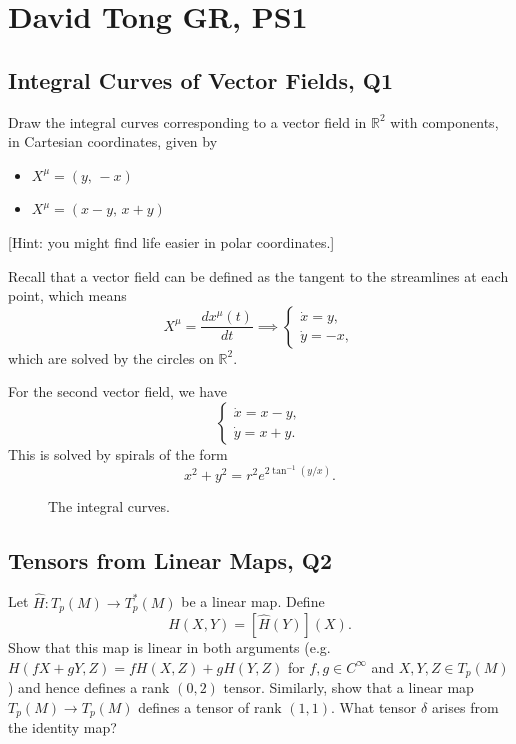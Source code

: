 \section{David Tong GR, PS1}
\subsection{Integral Curves of Vector Fields, Q1}

Draw the integral curves corresponding to a vector field in $\mathbb{R}^2$ with components, in Cartesian coordinates, given by
\begin{itemize}
    \item $X^\mu = (y,\,-x)$
    \item $X^\mu = (x-y,\,x+y)$
\end{itemize}
[Hint: you might find life easier in polar coordinates.]
\begin{solution}
    Recall that a vector field can be defined as the tangent to the streamlines at each point, which means
    \begin{equation}
        X^\mu = \frac{dx^\mu(t)}{dt}\implies\begin{cases}
            \dot x =y,\\
            \dot y = -x,
        \end{cases}
    \end{equation}
    which are solved by the circles on $\mathbb{R}^2$. 

    For the second vector field, we have
    \begin{equation}
        \begin{cases}
            \dot x = x-y,\\
            \dot y = x+y.
        \end{cases}
    \end{equation}
    This is solved by spirals of the form
    \begin{equation}
        x^2+y^2 = r^2e^{2\tan^{-1}(y/x)}.
    \end{equation}
\end{solution}
\begin{figure}
    \centering
    
    \caption{The integral curves.}
    \label{fig:placeholder}
\end{figure}
\subsection{Tensors from Linear Maps, Q2}

Let $\hat{H}: T_p(M)\to T_p^*(M)$ be a linear map. Define
\begin{equation}
    H(X,Y) = [\hat{H}(Y)](X).
\end{equation}
Show that this map is linear in both arguments (e.g.\ $H(fX+gY,Z) = fH(X,Z)+gH(Y,Z)$ for $f,g\in C^\infty$ and $X,Y,Z\in T_p(M)$) and hence defines a rank $(0,2)$ tensor. Similarly, show that a linear map $T_p(M)\to T_p(M)$ defines a tensor of rank $(1,1)$. What tensor $\delta$ arises from the identity map?

